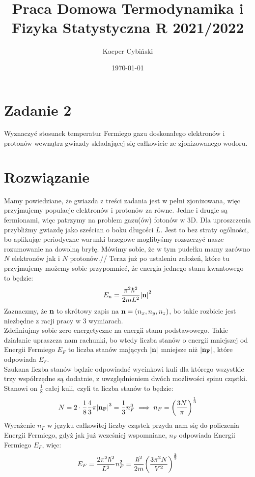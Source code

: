 \documentclass[12pt,a4paper]{article}
\title{Praca Domowa Termodynamika i Fizyka Statystyczna R 2021/2022}
\author{Kacper Cybiński}
\date{\today}
\begin{document}
\maketitle

\section{Zadanie 2}

Wyznaczyć stosunek temperatur Fermiego gazu doskonałego elektronów i protonów wewnątrz gwiazdy składającej się całkowicie ze zjonizowanego wodoru.

\section{Rozwiązanie}

Mamy powiedziane, że gwiazda z treści zadania jest w pełni zjonizowana, więc przyjmujemy populacje elektronów i protonów za równe. Jedne i drugie są fermionami, więc patrzymy na problem gazu(ów) fotonów w 3D. Dla uproszczenia przybliżmy gwiazdę jako sześcian o boku długości $L$. Jest to bez straty ogólności, bo aplikując periodyczne warunki brzegowe moglibyśmy rozszerzyć nasze rozumowanie na dowolną bryłę.
Mówimy sobie, że w tym pudełku mamy zarówno $N$ elektronów jak i $N$ protonów.//
Teraz już po ustaleniu założeń, które tu przyjmujemy możemy sobie przypomnieć, że energia jednego stanu kwantowego to będzie:
\[
    E_n = \frac{\pi^2 \hbar^2}{2 m L^2}\abs{\vb{n}}^2    
\]
Zaznaczmy, że $\vb{n}$ to skrótowy zapis na $\vb{n} = (n_x, n_y, n_z)$, bo takie rozbicie jest niezbędne z racji pracy w 3 wymiarach.\\
Zdefiniujmy sobie zero energetyczne na energii stanu podstawowego. Takie działanie upraszcza nam rachunki, bo wtedy liczba stanów o energii mniejszej od Energii Fermiego $E_F$ to liczba stanów mających $\abs{\vb{n}}$ mniejsze niż $\abs{\vb{n_F}}$, które odpowiada $E_F$.\\
Szukana liczba stanów będzie odpowiadać wycinkowi kuli dla którego wszystkie trzy współrzędne są dodatnie, z uwzględnieniem dwóch możliwości spinu cząstki. Stanowi on $\frac18$ całej kuli, czyli ta liczba stanów to będzie:
\[
    N = 2 \cdot \frac18 \frac43 \pi \abs{\vb{n_F}}^3 = \frac13 n_F^3 \implies n_F = \qty(\frac{3N}{\pi})^{\frac13}
\] 
Wyrażenie $n_F$ w języku całkowitej liczby cząstek przyda nam się do policzenia Energii Fermiego, gdyż jak już wcześniej wspomniane, $n_F$ odpowiada Energii Fermiego $E_F$, więc:
\[
    E_F = \frac{2 \pi^2 \hbar^2}{L^2} n_F^2 = \frac{\hbar^2}{2m} \qty(\frac{3 \pi^2 N}{V^2})^{\frac23}    
\]
\end{document}
